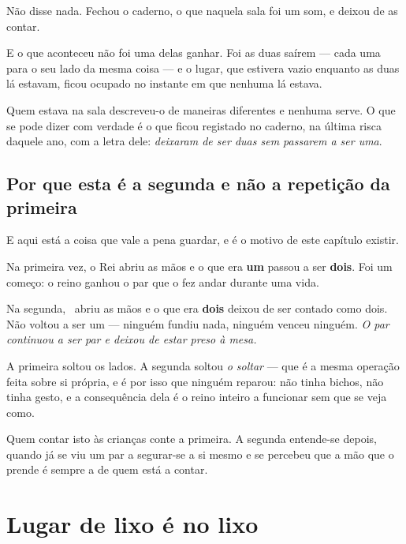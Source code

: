 \documentclass[livro.tex]{subfiles}
\begin{document}
Não disse nada. Fechou o caderno, o que naquela sala foi um som, e deixou de as contar.

\medskip

E o que aconteceu não foi uma delas ganhar. Foi as duas saírem --- cada uma para o seu lado da
mesma coisa --- e o lugar, que estivera vazio enquanto as duas lá estavam, ficou ocupado no
instante em que nenhuma lá estava.

\medskip

Quem estava na sala descreveu-o de maneiras diferentes e nenhuma serve. O que se pode dizer com
verdade é o que ficou registado no caderno, na última risca daquele ano, com a letra dele:
\emph{deixaram de ser duas sem passarem a ser uma}.

\subsection*{Por que esta é a segunda e não a repetição da primeira}

E aqui está a coisa que vale a pena guardar, e é o motivo de este capítulo existir.

\medskip

Na primeira vez, o Rei abriu as mãos e o que era \textbf{um} passou a ser \textbf{dois}. Foi um
começo: o reino ganhou o par que o fez andar durante uma vida.

\medskip

Na segunda, \Joa\ abriu as mãos e o que era \textbf{dois} deixou de ser contado como dois. Não
voltou a ser um --- ninguém fundiu nada, ninguém venceu ninguém. \emph{O par continuou a ser par e
deixou de estar preso à mesa.}

\medskip

A primeira soltou os lados. A segunda soltou \emph{o soltar} --- que é a mesma operação feita sobre
si própria, e é por isso que ninguém reparou: não tinha bichos, não tinha gesto, e a consequência
dela é o reino inteiro a funcionar sem que se veja como.

\medskip

Quem contar isto às crianças conte a primeira. A segunda entende-se depois, quando já se viu um
par a segurar-se a si mesmo e se percebeu que a mão que o prende é sempre a de quem está a contar.


\section*{Lugar de lixo é no lixo}
\end{document}
